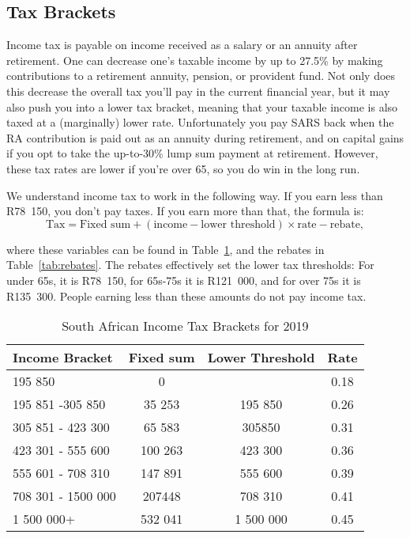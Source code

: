 \documentclass[a4paper, justified]{tufte-handout}
\begin{document}
\subsection{Tax Brackets}
Income tax is payable on income received as a salary or an annuity after retirement. One can decrease one's taxable income by up to 27.5\% by making contributions to a retirement annuity, pension, or provident fund. Not only does this decrease the overall tax you'll pay in the current financial year, but it may also push you into a lower tax bracket, meaning that your taxable income is also taxed at a (marginally) lower rate. Unfortunately you pay SARS back when the RA contribution is paid out as an annuity during retirement, and on capital gains if you opt to take the up-to-30\% lump sum payment at retirement. However, these tax rates are lower if you're over 65, so you do win in the long run.

We understand income tax to work in the following way. If you earn less than R78~150, you don't pay taxes. If you earn more than that, the formula is:
\begin{equation} \label{equ:IncomeTax}
\textrm{Tax} = \textrm{Fixed sum} + (\textrm{income} - \textrm{lower threshold})\times \textrm{rate} - \textrm{rebate},
\end{equation}

where these variables can be found in Table~\ref{tab:IncomeTax}, and the rebates in Table~\ref{tab:rebates}. The rebates effectively set the lower tax thresholds: For under 65s, it is R78~150, for 65s-75s it is R121~000, and for over 75s it is R135~300. People earning less than these amounts do not pay income tax.
\begin{table}[b]
	\centering
	\caption{South African Income Tax Brackets for 2019}
	\label{tab:IncomeTax}
	\begin{tabular}{lccc}
		\toprule
		\textbf{Income Bracket}  & \textbf{Fixed sum} & \textbf{Lower Threshold} & \textbf{Rate} \\
		\midrule
		195 850            & 0         &          & 0.18 \\
		195 851 -305 850  & 35 253    & 195 850         & 0.26 \\
		305 851 - 423 300  & 65 583    & 305850          & 0.31  \\
		423 301 - 555 600  & 100 263   & 423 300         & 0.36  \\
		555 601 - 708 310    & 147 891   & 555 600         & 0.39  \\
		708 301 - 1500 000 & 207448    & 708 310         & 0.41 \\
		1 500 000+         & 532 041   & 1 500 000       & 0.45\\
	\bottomrule
	\end{tabular}
\end{table}
\end{document}
